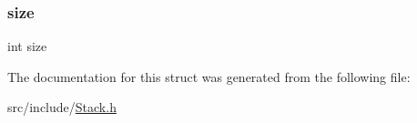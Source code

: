 \mbox{\label{struct_stack_a439227feff9d7f55384e8780cfc2eb82}} 
\subsubsection{\texorpdfstring{size}{size}}
{\footnotesize\ttfamily int size}



The documentation for this struct was generated from the following file\+:\begin{DoxyCompactItemize}
\item 
src/include/\hyperlink{_stack_8h}{Stack.\+h}\end{DoxyCompactItemize}
